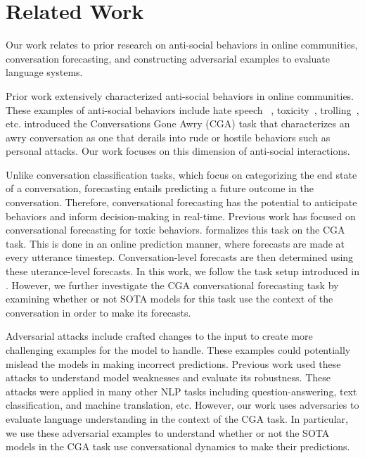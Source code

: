 \section{Related Work}
Our work relates to prior research on anti-social behaviors in online 
communities, conversation forecasting, and constructing adversarial examples
to evaluate language systems.

Prior work extensively characterized anti-social behaviors in online communities.
%
These examples of anti-social behaviors include hate speech ~\citep{}, 
toxicity~\citep{}, trolling~\citep{}, etc. 
%
\citep{zhang-etal-2018-conversations} introduced the Conversations Gone Awry (CGA)
task that characterizes an awry conversation as one that derails into rude or 
hostile behaviors such as personal attacks. 
%
Our work focuses on this dimension of anti-social interactions.

Unlike conversation classification tasks, which focus on categorizing the end 
state of a conversation, forecasting entails predicting a future outcome in 
the conversation. 
%
Therefore, conversational forecasting has the potential to anticipate behaviors 
and inform decision-making in real-time.
%
Previous work has focused on conversational forecasting for toxic behaviors\cite{}. 
%
\cite{chang-danescu-niculescu-mizil-2019-trouble} formalizes this task on the CGA 
task. 
%
This is done in an online prediction manner, where forecasts are made at every 
utterance timestep.
%
Conversation-level forecasts are then determined using these uterance-level forecasts.
%
In this work, we follow the task setup introduced in 
\cite{chang-danescu-niculescu-mizil-2019-trouble}.
%
However, we further investigate the CGA conversational forecasting task 
by examining whether or not SOTA models for this task use the context of 
the conversation in order to make its forecasts.


Adversarial attacks include crafted changes to the input to create more challenging
examples for the model to handle.
%
These examples could potentially mislead the models in making incorrect predictions.
%
Previous work used these attacks to understand model weaknesses and evaluate its 
robustness.
%
These attacks were applied in many other NLP tasks including question-answering\citep{}, 
text classification\cite{}, and machine translation\cite{}, etc.
%
However, our work uses adversaries to evaluate language understanding in the context of 
the CGA task. 
%
In particular, we use these adversarial examples to understand whether or not the 
SOTA models in the CGA task use conversational dynamics to make their predictions.
